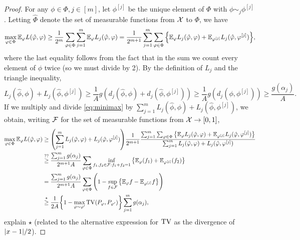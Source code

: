 \begin{proof}
	For any $\phi \in \Phi, j \in [m]$, let $\phi^{[j]}$ be the unique element of $\Phi$ with $\phi \sim_j \phi^{[j]}$. Letting $\hat\Phi$ denote the set of measurable functions from $\mathcal X$ to $\Phi$, we have
\begin{equation} \label{eq:minimax}
		 \max_{\varphi \in \Phi} \mathbb E_\varphi L(\hat{\varphi}, \varphi) \geq \frac1{2^m} \sum_{\varphi \in \Phi} \sum_{j=1}^m \mathbb E_\varphi L_j(\hat{\varphi}, \varphi) = \frac1{2^{m+1}} \sum_{j=1}^m \sum_{\varphi \in \Phi} \qty{\mathbb E_\varphi L_j(\hat{\varphi},\varphi) + \mathbb E_{\varphi^{[j]}} L_j(\hat{\varphi}, \varphi^{[j]})},
	 	\end{equation}
 	where the last equality follows from the fact that in the sum we count every element of $\phi$ twice (so we must divide by 2). By the definition of $L_j$ and the triangle inequality,
 	\[
 	L_j(\hat\phi, \phi) + L_j(\hat \phi, \phi^{[j]}) \geq \frac1A g(d_j(\hat\phi, \phi) + d_j(\hat\phi, \phi^{[j]})) \geq \frac1A g(d_j(\phi, \phi^{[j]})) \geq \frac{g(\alpha_j)}{A}.
 	\]
 	If we multiply and divide \cref{eq:minimax} by $\sum_{j=1}^m L_j(\hat\phi, \phi) + L_j(\hat\phi, \phi^{[j]})$, we obtain, writing $\mathcal F$ for the set of measurable functions from $\mathcal X\to [0, 1]$, 
 	\begin{align*}
 	\max_{\varphi \in \Phi} \mathbb E_\varphi L(\hat{\varphi}, \varphi) &\geq \qty(\sum_{j=1}^m L_j(\hat{\varphi},\varphi) + L_j(\hat{\varphi}, \varphi^{[j]}))\frac1{2^{m+1}}  \frac{ \sum_{j=1}^m \sum_{\varphi \in \Phi} \qty{\mathbb E_\varphi L_j(\hat{\varphi},\varphi) + \mathbb E_{\varphi^{[j]}} L_j(\hat{\varphi}, \varphi^{[j]})}}{\sum_{j=1}^m L_j(\hat{\varphi}, \varphi) + L_j(\hat{\varphi}, \varphi^{[j]})} \\
 	&\overset{??}\geq \frac{\sum_{j=1}^m g(\alpha_j)}{2^{m+1}A} \sum_{\varphi \in \Phi} \inf_{f_1, f_2 \in \mathcal F: f_1 + f_2 =1 } \qty{\mathbb E_\varphi(f_1) + \mathbb E_{\varphi^{[j]}} (f_2)} \\ 
 	&= \frac{\sum_{j=1}^m g(\alpha_j)}{2^{m+1}A}  \sum_{\varphi \in \Phi}\qty(1 - \sup_{f \in \mathcal F}\qty{ \mathbb E_\varphi f - \mathbb E_{\varphi^{[j]}} f}) \\ 
 	&\overset\star\geq \frac1{2A} \qty{1 - \max_{\varphi\sim \varphi'} \operatorname{TV}(P_\varphi, P_{\varphi'})} \sum_{j=1}^m g(\alpha_j), 
  	\end{align*}
  \TODO explain $\star$ (related to the alternative expression for $\operatorname{TV}$ as the divergence of $\abs{x-1}/2$).
\end{proof}

